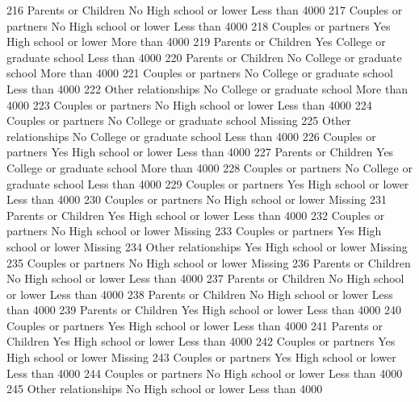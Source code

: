 \documentclass[
  letterpaper,
  DIV=11,
  numbers=noendperiod]{scrreprt}
\newenvironment{Shaded}{\begin{snugshade}}{\end{snugshade}}
\newcommand{\NormalTok}[1]{\textcolor[rgb]{0.00,0.23,0.31}{#1}}
\begin{document}
\begin{Shaded}
\begin{Highlighting}[]
\NormalTok{216 Parents or Children       No       High school or lower Less than 4000}
\NormalTok{217 Couples or partners       No       High school or lower Less than 4000}
\NormalTok{218 Couples or partners      Yes       High school or lower More than 4000}
\NormalTok{219 Parents or Children      Yes College or graduate school Less than 4000}
\NormalTok{220 Parents or Children       No College or graduate school More than 4000}
\NormalTok{221 Couples or partners       No College or graduate school Less than 4000}
\NormalTok{222 Other relationships       No College or graduate school More than 4000}
\NormalTok{223 Couples or partners       No       High school or lower Less than 4000}
\NormalTok{224 Couples or partners       No College or graduate school        Missing}
\NormalTok{225 Other relationships       No College or graduate school Less than 4000}
\NormalTok{226 Couples or partners      Yes       High school or lower Less than 4000}
\NormalTok{227 Parents or Children      Yes College or graduate school More than 4000}
\NormalTok{228 Couples or partners       No College or graduate school Less than 4000}
\NormalTok{229 Couples or partners      Yes       High school or lower Less than 4000}
\NormalTok{230 Couples or partners       No       High school or lower        Missing}
\NormalTok{231 Parents or Children      Yes       High school or lower Less than 4000}
\NormalTok{232 Couples or partners       No       High school or lower        Missing}
\NormalTok{233 Couples or partners      Yes       High school or lower        Missing}
\NormalTok{234 Other relationships      Yes       High school or lower        Missing}
\NormalTok{235 Couples or partners       No       High school or lower        Missing}
\NormalTok{236 Parents or Children       No       High school or lower Less than 4000}
\NormalTok{237 Parents or Children       No       High school or lower Less than 4000}
\NormalTok{238 Parents or Children       No       High school or lower Less than 4000}
\NormalTok{239 Parents or Children      Yes       High school or lower Less than 4000}
\NormalTok{240 Couples or partners      Yes       High school or lower Less than 4000}
\NormalTok{241 Parents or Children      Yes       High school or lower Less than 4000}
\NormalTok{242 Couples or partners      Yes       High school or lower        Missing}
\NormalTok{243 Couples or partners      Yes       High school or lower Less than 4000}
\NormalTok{244 Couples or partners       No       High school or lower Less than 4000}
\NormalTok{245 Other relationships       No       High school or lower Less than 4000}

\end{Highlighting}
\end{Shaded}
\end{document}
